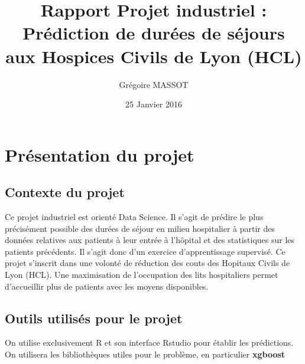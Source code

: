 \documentclass[a4paper,11pt]{article}
\title{Rapport Projet industriel : Prédiction de durées de séjours aux Hospices Civils de Lyon (HCL)}
\author{Grégoire MASSOT}
\date{25 Janvier 2016}
\begin{document}
\sffamily
\maketitle
\begin{figure}[H]
\centering
{}
\end{figure}

\tableofcontents

\newpage

\section{Présentation du projet}
\subsection{Contexte du projet}
Ce projet industriel est orienté Data Science. Il s'agit de prédire le plus précisément possible des durées de séjour en milieu hospitalier à partir des données relatives aux patients à leur entrée à l'hôpital et des statistiques sur les patients précédents. Il s'agit donc d'un exercice d'apprentissage supervisé.
\newline
\newline
Ce projet s'inscrit dans une volonté de réduction des couts des Hopitaux Civils de Lyon (HCL). Une maximisation de l'occupation des lits hospitaliers permet d'accueillir plus de patients avec les moyens disponibles.
\subsection{Outils utilisés pour le projet}
On utilise exclusivement R et son interface Rstudio pour établir les prédictions. On utilisera les bibliothèques utiles pour le problème, en particulier \textbf{xgboost}
\end{document}
